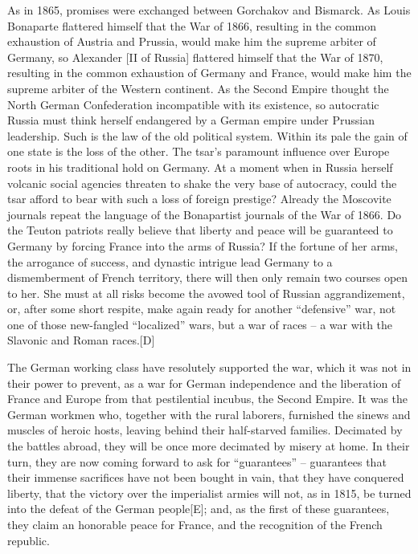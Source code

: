 \documentclass{article}
\begin{document}
As in 1865, promises were exchanged between Gorchakov and Bismarck. As
Louis Bonaparte flattered himself that the War of 1866, resulting in the
common exhaustion of Austria and Prussia, would make him the supreme
arbiter of Germany, so Alexander [II of Russia] flattered himself that the
War of 1870, resulting in the common exhaustion of Germany and France,
would make him the supreme arbiter of the Western continent. As the Second
Empire thought the North German Confederation incompatible with its
existence, so autocratic Russia must think herself endangered by a German
empire under Prussian leadership. Such is the law of the old political
system. Within its pale the gain of one state is the loss of the other.
The tsar’s paramount influence over Europe roots in his traditional hold
on Germany. At a moment when in Russia herself volcanic social agencies
threaten to shake the very base of autocracy, could the tsar afford to
bear with such a loss of foreign prestige? Already the Moscovite journals
repeat the language of the Bonapartist journals of the War of 1866. Do the
Teuton patriots really believe that liberty and peace will be guaranteed
to Germany by forcing France into the arms of Russia? If the fortune of
her arms, the arrogance of success, and dynastic intrigue lead Germany to
a dismemberment of French territory, there will then only remain two
courses open to her. She must at all risks become the avowed tool of
Russian aggrandizement, or, after some short respite, make again ready for
another “defensive” war, not one of those new-fangled “localized” wars,
but a war of races – a war with the Slavonic and Roman races.[D]

The German working class have resolutely supported the war, which it was
not in their power to prevent, as a war for German independence and the
liberation of France and Europe from that pestilential incubus, the Second
Empire. It was the German workmen who, together with the rural laborers,
furnished the sinews and muscles of heroic hosts, leaving behind their
half-starved families. Decimated by the battles abroad, they will be once
more decimated by misery at home. In their turn, they are now coming
forward to ask for “guarantees” – guarantees that their immense sacrifices
have not been bought in vain, that they have conquered liberty, that the
victory over the imperialist armies will not, as in 1815, be turned into
the defeat of the German people[E]; and, as the first of these guarantees,
they claim an honorable peace for France, and the recognition of the
French republic.
\end{document}
